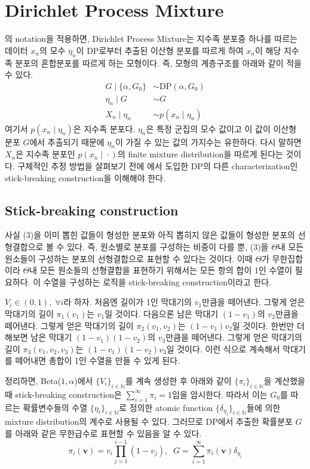 \documentclass{article}
\begin{document}
\section{Dirichlet Process Mixture}
\cite{blei2006}의 notation을 적용하면, Dirichlet Process Mixture는 지수족 분포중 하나를 따르는 데이터 $x_n$의 모수 $\eta_n$이 DP로부터 추출된 이산형 분포를 따르게 하여 $x_n$이 해당 지수족 분포의 혼합분포를 따르게 하는 모형이다.
즉, 모형의 계층구조를 아래와 같이 적을 수 있다.
\begin{align*}
    G\;|\;\{\alpha,G_0\}&\sim \text{DP}(\alpha,G_0)\\
    \eta_n\;|\;G&\sim G\\
    X_n\;|\;\eta_n&\sim p(x_n\;|\;\eta_n)
\end{align*}
여기서 $p(x_n\;|\;\eta_n)$은 지수족 분포다. 
$\eta_n$은 특정 군집의 모수 값이고 이 값이 이산형 분포 $G$에서 추출되기 때문에 $\eta_n$이 가질 수 있는 값의 가지수는 유한하다.
다시 말하면 $X_n$은 지수족 분포인 $p(x_n\;|\;\cdot)$의 finite mixture distribution을 따르게 된다는 것이다.
구체적인 추정 방법을 살펴보기 전에 \cite{blei2006}에서 도입한 DP의 다른 characterization인 stick-breaking construction을 이해해야 한다.
\subsection{Stick-breaking construction}
사실 (3)을 이미 뽑힌 값들이 형성한 분포와 아직 뽑히지 않은 값들이 형성한 분포의 선형결합으로 볼 수 있다. 
즉, 원소별로 분포를 구성하는 비중이 다를 뿐, (3)을 $\Theta$내 모든 원소들이 구성하는 분포의 선형결합으로 표현할 수 있다는 것이다.
이때 $\Theta$가 무한집합이라 $\Theta$내 모든 원소들의 선형결합을 표현하기 위해서는 모든 항의 합이 1인 수열이 필요하다.
이 수열을 구성하는 로직을 stick-breaking construction이라고 한다.\bigskip

\noindent $V_i\in(0,1),\;\forall i$라 하자. 
처음엔 길이가 1인 막대기의 $v_1$만큼을 떼어낸다. 
그렇게 얻은 막대기의 길이 $\pi_1(v_1)$는 $v_1$일 것이다.
다음으론 남은 막대기 $(1-v_1)$의 $v_2$만큼을 떼어낸다. 
그렇게 얻은 막대기의 길이 $\pi_2(v_1, v_2)$는 $(1-v_1)v_2$일 것이다.
한번만 더 해보면 남은 막대기 $(1-v_1)(1-v_2)$의 $v_3$만큼을 떼어낸다.
그렇게 얻은 막대기의 길이 $\pi_3(v_1, v_2, v_3)$는 $(1-v_1)(1-v_2)v_3$일 것이다.
이런 식으로 계속해서 막대기를 떼어내면 총합이 1인 수열을 만들 수 있게 된다.\bigskip

\noindent 정리하면, Beta($1,\alpha$)에서 $\{V_i\}_{i\in\mathbb{N}}$를 계속 생성한 후 아래와 같이 $\{\pi_i\}_{i\in\mathbb{N}}$을 계산했을 때 stick-breaking construction은 $\sum_{i=1}^\infty\pi_i=1$임을 암시한다.
따라서 이는 $G_0$를 따르는 확률변수들의 수열 $\{\eta_i\}_{i\in\mathbb{N}}$로 정의한 atomic function $\{\delta_{\eta_i}\}_{i\in\mathbb{N}}$들에 의한 mixture distribution의 계수로 사용될 수 있다.
그러므로 DP에서 추출한 확률분포 $G$를 아래와 같은 무한급수로 표현할 수 있음을 알 수 있다.
\begin{equation}
    \pi_{i}(\mathbf{v})=v_{i} \prod_{j=1}^{i-1}\left(1-v_{j}\right),\;\;G=\sum_{i=1}^{\infty} \pi_{i}(\mathbf{v}) \delta_{\eta_{i}}
\end{equation}
\end{document}
